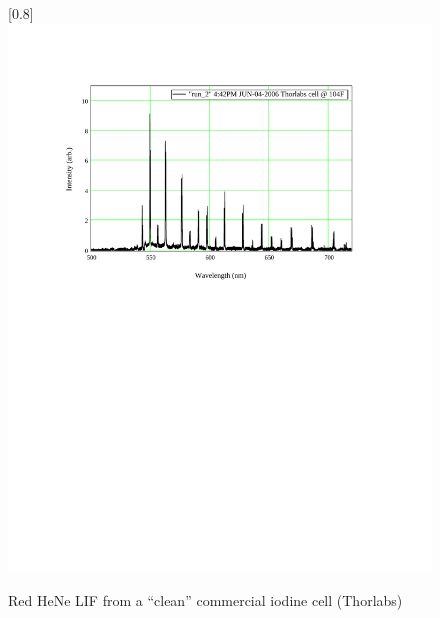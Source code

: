 \begin{figure}
\scalebox{0.8}[0.8]{
\includegraphics[bb=40 425 489 685]
{iodine_clean/iodine_clean.pdf}
}
\caption{Red HeNe LIF from a ``clean'' commercial iodine cell (Thorlabs)}
\label{iodine_clean}
\end{figure}
